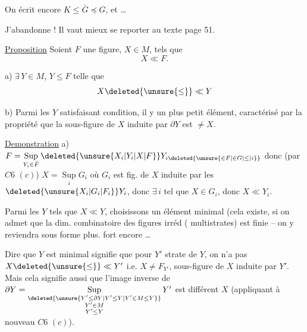 On écrit encore $K\leq\bar G\preceq G$, et \ldots

 J'abandonne ! Il vaut mieux se reporter au texte page 51.




\uline{Proposition} Soient $F$ une figure, $X\in M$, tels que
\[
 X\ll F.
\]

a)  $\exists\,Y\in M$, $Y\leq F$ telle que
\[
 X\deleted{\unsure{\leq}}\ll Y
\]

b) Parmi les $Y$ satisfaisant  condition, il y un plus petit élément,     caractérisé par la propriété que la sous-figure de $X$ induite par $\partial Y$ est $\neq X$.

\uline{Demonstration} a) $F=\mathop{\mathrm{Sup}}\limits_{Y_i\in\bar F}\deleted{\unsure{X_i|Y_i|X|F}}Y_{i\deleted{\unsure{\in F|\in G|\leq|i}}}$ donc  (par $C6$ $(c)$) $X=\mathop{\mathrm{Sup}}\limits_{i}G_i$ où $G_i$ est   fig. de $X$ induite par les $\deleted{\unsure{X_i|G_i|F_i}}Y_i$, donc $\exists\,i$ tel que $X\in G_i$, donc $X\ll Y_i$.


Parmi les $Y$ tels que $X\ll Y$, choisissons un élément minimal (cela existe, si on admet que la dim. combinatoire des figures irréd ( multistrates) est finie -- on y reviendra sous forme   plus. fort encore \ldots\ 

Dire que $Y$ est minimal signifie que pour $Y'$ strate de $Y$, on n'a pas $X\deleted{\unsure{\leq}}\ll Y'$ i.e. $X\neq F_{Y'}$, sous-figure de $X$ induite par $Y'$. Mais cela signifie aussi que l'image inverse de $\partial Y=\mathop{\mathrm{Sup}}\limits_{\substack{\deleted{\unsure{Y'\leq\partial Y|Y'\leq Y|Y'\in M\leq Y}}\\Y'\in M\\Y'\leq Y}}Y'$ est différent  $X$ (appliquant à nouveau $C6$ $(c)$). 

